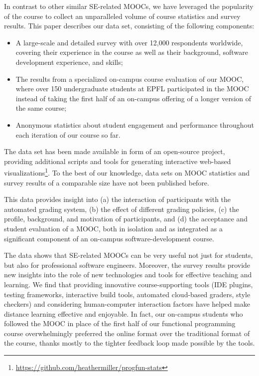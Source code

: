 \documentclass{sig-alternate}
\begin{document}
In contrast to other similar SE-related MOOCs, we have leveraged the popularity of the course to collect an unparalleled volume of course statistics and survey results. This paper describes our data set, consisting of the following components:

\begin{itemize}
\item A large-scale and detailed survey with over 12,000 respondents worldwide, covering their experience in the course as well as their background, software development experience, and skills;
\item The results from a specialized on-campus course evaluation of our MOOC, where over 150 undergraduate students at EPFL participated in the MOOC instead of taking the first half of an on-campus offering of a longer version of the same course;
\item Anonymous statistics about student engagement and performance throughout each iteration of our course so far.
\end{itemize}

The data set has been made available in form of an open-source project, providing additional scripts and tools for generating interactive web-based visualizations\footnote{\url{https://github.com/heathermiller/progfun-stats}}. To the best of our knowledge, data sets on MOOC statistics and survey results of a comparable size have not been published   before.

This data provides insight into (a) the interaction of participants with the automated grading system, (b) the effect of different grading policies, (c) the profile, background, and motivation of participants, and (d) the acceptance and student evaluation of a MOOC, both in isolation and as integrated as a significant component of an on-campus software-development course.

The data shows that SE-related MOOCs can be very useful not just for students, but
  also for professional software engineers.
  Moreover, the survey results provide new insights into the role of new technologies and tools
  for effective teaching and learning. We find that providing innovative course-supporting tools (IDE plugins, testing frameworks, interactive build tools, automated cloud-based graders, style checkers) and considering human-computer interaction factors have helped make distance learning effective and enjoyable. In fact, our on-campus students who followed the MOOC in place of the first half of our functional programming course overwhelmingly preferred the online format over the traditional format of the course, thanks mostly to the tighter feedback loop made possible by the tools.
\end{document}
